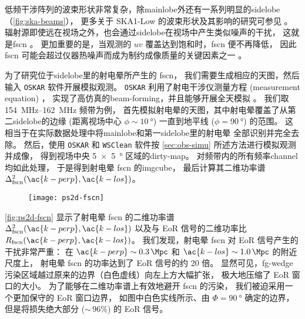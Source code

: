 低频干涉阵列的波束形状非常复杂，除\ac{mainlobe}外还有一系列明显的\ac{sidelobe}
\cite{noordam2004,wijnholds2010}（\autoref{fig:ska-beams}），
更多关于 SKA1-Low 的波束形状及其影响的研究可参见 。
辐射源即使远在视场之外，也会通过\ac{sidelobe}在视场中产生类似噪声的干扰，
这就是\acf{fscn} \cite{smirnov2012}。
更加重要的是，当观测的 $uv$ 覆盖达到饱和时，\ac{fscn} 便不再降低，
因此 \ac{fscn} 可能会超过仪器热噪声而成为制约成像质量的关键因素之一 \cite{mort2017}。

为了研究位于\ac{sidelobe}里的射电晕所产生的 \ac{fscn}，
我们需要生成相应的天图，然后输入 \texttt{OSKAR} 软件开展模拟观测。
\texttt{OSKAR} 利用了射电干涉仪测量方程 (measurement equation) \cite{smirnov2011}，
实现了高仿真的\ac{beam-forming}，并且能够开展全天模拟 \cite{mort2010}。
我们取 \SIrange{154}{162}{\MHz} 频带为例，
首先模拟射电晕的天图，其中射电晕覆盖了从第二\ac{sidelobe}的边缘
(距离视场中心 $\phi \sim \SI{10}{\degree}$)
一直到地平线 ($\phi = \SI{90}{\degree}$) 的范围。
这相当于在实际数据处理中将\ac{mainlobe}和第一\ac{sidelobe}里的射电晕
全部识别并完全去除。
然后，使用 \texttt{OSKAR} 和 \texttt{WSClean} 软件按
\autoref{sec:obs-simu} 所述方法进行模拟观测并成像，
得到视场中央 \SI{5 x 5}{\degree} 区域的\ac{dirty-map}。
对频带内的所有频率\ac{channel}均如此处理，
于是得到射电晕 \ac{fscn} 的\ac{imgcube}，
最后计算其二维功率谱 $\Delta^2_{\R{fscn}}(\ac{k-perp}, \ac{k-los})$。

\begin{figure}[htp]
  \centering
  \texttt{[image: ps2d-fscn]}
  \label{fig:ps2d-fscn}
\end{figure}

\autoref{fig:ps2d-fscn} 显示了射电晕 \ac{fscn}
的二维功率谱 $\Delta^2_{\R{fscn}}(\ac{k-perp}, \ac{k-los})$
以及与 EoR 信号的二维功率比 $R_{\R{fscn}}(\ac{k-perp}, \ac{k-los})$。
我们发现，射电晕 \ac{fscn} 对 EoR 信号产生的干扰非常严重：
在 $\ac{k-perp} \sim \SI{0.3}{\per\Mpc}$
和 $\ac{k-los} \sim \SI{1.0}{\per\Mpc}$ 的附近尺度上，
射电晕 \ac{fscn} 的功率达到了 EoR 信号的约 20 倍。
显然可见，\ac{fg-wedge}污染区域越过原来的边界（白色虚线）向左上方大幅扩张，
极大地压缩了 EoR 窗口的大小。
为了能够在二维功率谱上有效地避开 \ac{fscn} 的污染，
我们被迫采用一个更加保守的 EoR 窗口边界，
如图中白色实线所示、由 $\Phi = \SI{90}{\degree}$ 确定的边界，
但是将损失绝大部分 ($\sim$\,96\%) 的 EoR 信号。

